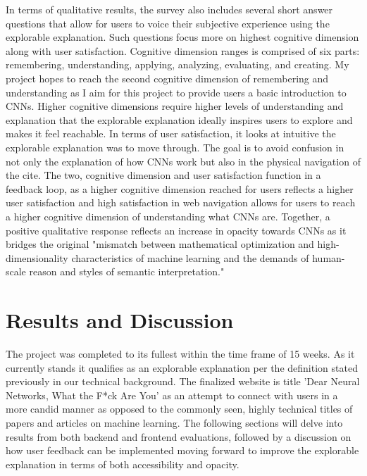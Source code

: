 \documentclass[10pt,twocolumn]{article}
\begin{document}
In terms of qualitative results, the survey also includes several short answer questions that allow for users to voice their subjective experience using the explorable explanation. Such questions focus more on highest cognitive dimension along with user satisfaction. Cognitive dimension ranges is comprised of six parts: remembering, understanding, applying, analyzing, evaluating, and creating. My project hopes to reach the second cognitive dimension of remembering and understanding as I aim for this project to provide users a basic introduction to CNNs. Higher cognitive dimensions require higher levels of understanding and explanation that the explorable explanation ideally inspires users to explore and makes it feel reachable. \cite{cognitiveDimension} In terms of user satisfaction, it looks at intuitive the explorable explanation was to move through. The goal is to avoid confusion in not only the explanation of how CNNs work but also in the physical navigation of the cite. The two, cognitive dimension and user satisfaction function in a feedback loop, as a higher cognitive dimension reached for users reflects a higher user satisfaction and high satisfaction in web navigation allows for users to reach a higher cognitive dimension of understanding what CNNs are. \cite{ExplorableExplanation} Together, a positive qualitative response reflects an increase in opacity towards CNNs as it bridges the original "mismatch between mathematical optimization and high-dimensionality characteristics of machine learning and the demands of human-scale reason and styles of semantic interpretation." 
\cite{MLOpacity} 

\section{Results and Discussion}
The project was completed to its fullest within the time frame of 15 weeks. As it currently stands it qualifies as an explorable explanation per the definition stated previously in our technical background. The finalized website is title 'Dear Neural Networks, What the F*ck Are You' as an attempt to connect with users in a more candid manner as opposed to the commonly seen, highly technical titles of papers and articles on machine learning. The following sections will delve into results from both backend and frontend evaluations, followed by a discussion on how user feedback can be implemented moving forward to improve the explorable explanation in terms of both accessibility and opacity. 
\end{document}
